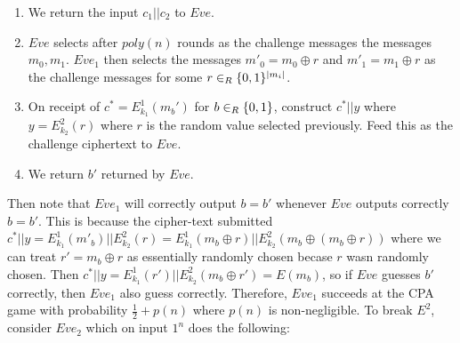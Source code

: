 \documentclass{article}
\begin{document}
\begin{enumerate}
\begin{enumerate}[noitemsep,topsep=\mdcompacttopsep,start=0]
\item{}We return the input $c_1 || c_2$ to $Eve$.%

\item{}$Eve$ selects after $poly(n)$ rounds as the challenge
messages the messages $m_0, m_1$. $Eve_1$ then selects the messages $m'_0 = m_0 \oplus r$ and $m'_1 = m_1 \oplus r$
as the challenge messages for some $r \in_R \{0,1\}^{|m_i|}$.%

\item{}On receipt of $c^* = E^1_{k_1}(m_b')$ for $b \in_R \{0,1\}$, construct $c^*|| y$ where 
$y = E^2_{k_2}(r)$ where $r$ is the random value selected previously. Feed this as
the challenge ciphertext to $Eve$.%

\item{}We return $b'$ returned by $Eve$.%
\end{enumerate}%

Then note that $Eve_1$ will correctly output $b = b'$ whenever $Eve$ outputs correctly $b = b'$. 
This is because the cipher-text submitted 
$c^* || y = E^1_{k_1}(m'_b) || E_{k_2}^2(r) = E^1_{k_1}(m_b \oplus r) || E_{k_2}^2(m_b \oplus (m_b \oplus r))$
where we can treat $r' = m_b \oplus r$ as essentially randomly chosen becase $r$ wasn randomly
chosen. Then $c^* || y = E^1_{k_1}(r') || E^2_{k_2}(m_b \oplus r') = E(m_b)$, so if $Eve$ 
guesses $b'$ correctly, then $Eve_1$ also guess correctly. Therefore, $Eve_1$ succeeds at the CPA
game with probability $\frac{1}{2} + p(n)$ where $p(n)$ is non-negligible. To break $E^2$, consider
$Eve_2$ which on input $1^n$ does the following:%


\end{enumerate}
\end{document}
